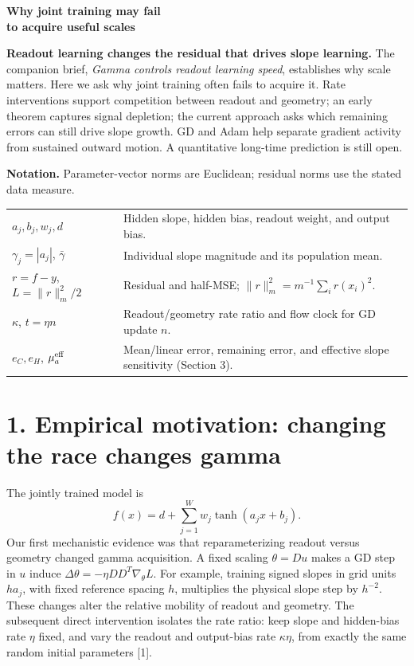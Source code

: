 \documentclass[10pt]{article}
\begin{document}
\thispagestyle{plain}
{\color{ink}\fontsize{22}{25}\selectfont\bfseries Why joint training may fail\\to acquire useful scales\par}
\vspace{3pt}
\textbf{Readout learning changes the residual that drives slope learning.}
The companion brief, \emph{Gamma controls readout learning speed}, establishes
why scale matters. Here we ask why joint training often fails to acquire it.
Rate interventions support competition between readout and geometry; an early
theorem captures signal depletion; the current approach asks which remaining
errors can still drive slope growth. GD and Adam help separate gradient activity
from sustained outward motion. A quantitative long-time prediction is still open.

{\small
\textbf{Notation.} Parameter-vector norms are Euclidean; residual norms use the stated data measure.\par
\begin{tabularx}{\linewidth}{@{}lX@{}}
\toprule
$a_j,b_j,w_j,d$ & Hidden slope, hidden bias, readout weight, and output bias.\\
$\gamma_j=|a_j|$, $\bar\gamma$ & Individual slope magnitude and its population mean.\\
$r=f-y$, $L=\|r\|_m^2/2$ & Residual and half-MSE; $\|r\|_m^2=m^{-1}\sum_i r(x_i)^2$.\\
$\kappa$, $t=\eta n$ & Readout/geometry rate ratio and flow clock for GD update $n$.\\
$e_C,e_H$, $\mu_a^{\rm eff}$ & Mean/linear error, remaining error, and effective slope sensitivity (Section 3).\\
\bottomrule
\end{tabularx}}

\section*{1. Empirical motivation: changing the race changes gamma}
The jointly trained model is
\begin{equation}\label{eq:model}
 f(x)=d+\sum_{j=1}^W w_j\tanh(a_jx+b_j).
\end{equation}
Our first mechanistic evidence was that reparameterizing readout versus
geometry changed gamma acquisition. A fixed scaling
$\theta=Du$ makes a GD step in $u$ induce
$\Delta\theta=-\eta DD^T\nabla_\theta L$. For example, training signed slopes
in grid units $h a_j$, with fixed reference spacing $h$, multiplies the physical
slope step by $h^{-2}$.
These changes alter the relative mobility of readout and geometry.
The subsequent direct intervention isolates the rate ratio: keep slope and
hidden-bias rate $\eta$ fixed, and vary the readout and output-bias rate
$\kappa\eta$, from exactly the same random initial parameters [1].
\end{document}
